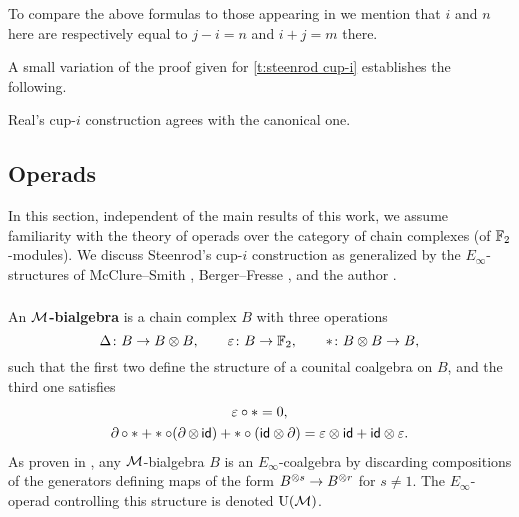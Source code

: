 \begin{remark}
	To compare the above formulas to those appearing in \cite[Corollary 3.2]{gonzalez-diaz1999steenrod} we mention that $i$ and $n$ here are respectively equal to $j-i=n$ and $i+j=m$ there.
\end{remark}

A small variation of the proof given for \cref{t:steenrod cup-i} establishes the following.

\begin{theorem}
	Real's \mbox{cup-$i$} construction agrees with the canonical one.
\end{theorem}

\subsection{Operads} \label{ss:operads}

In this section, independent of the main results of this work, we assume familiarity with the theory of operads over the category of chain complexes (of ${\mathbb{F}_2}$-modules).
We discuss Steenrod's cup-$i$ construction as generalized by the $E_\infty$-structures of McClure--Smith \cite{mcclure2003multivariable}, Berger--Fresse \cite{berger2004combinatorial}, and the author \cite{medina2020prop1,medina2021prop2}.

\subsubsection{}

An \textbf{$\operatorname{\mathcal{M}}$-bialgebra} is a chain complex $B$ with three operations
\[
\Delta \colon B \to B \otimes B, \qquad
\varepsilon \colon B \to {\mathbb{F}_2}, \qquad
\ast \colon B \otimes B \to B,
\]
such that the first two define the structure of a counital coalgebra on $B$, and the third one satisfies
\begin{gather*}
\varepsilon \circ \ast = 0, \\
\operatorname{\partial} \circ \ast + \ast \circ (\operatorname{\partial} \otimes \, \mathsf{id}) + \ast \circ (\mathsf{id} \otimes \operatorname{\partial}) =
\varepsilon \otimes \mathsf{id} + \mathsf{id} \otimes \varepsilon.
\end{gather*}
As proven in \cite{medina2020prop1}, any $\operatorname{\mathcal{M}}$-bialgebra $B$ is an $E_\infty$-coalgebra by discarding compositions of the generators defining maps of the form $B^{\otimes s} \to B^{\otimes r}$ for $s \neq 1$.
The $E_\infty$-operad controlling this structure is denoted $\operatorname{U}(\operatorname{\mathcal{M}})$.

